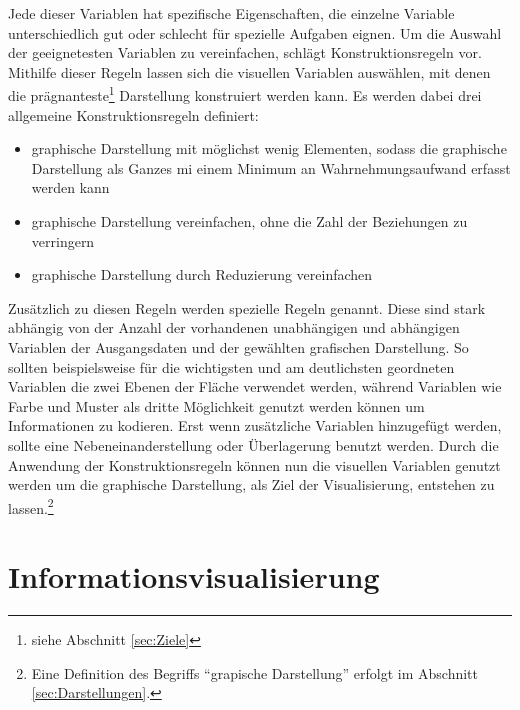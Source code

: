 \documentclass[a4paper, 12pt, DIVcalc, onepage, pdftex, headsepline, footsepline]{scrreprt}
\begin{document}
Jede dieser Variablen hat spezifische Eigenschaften, die einzelne Variable unterschiedlich gut oder schlecht
für spezielle Aufgaben eignen. Um die Auswahl der geeignetesten Variablen zu vereinfachen, schlägt
\citep{Bertin} Konstruktionsregeln vor.
Mithilfe dieser Regeln lassen sich die visuellen Variablen auswählen, mit denen die
prägnanteste\footnote{siehe Abschnitt \ref{sec:Ziele}} Darstellung konstruiert werden kann.
Es werden dabei drei allgemeine Konstruktionsregeln definiert:
\begin{itemize}
\item graphische Darstellung mit möglichst wenig Elementen, sodass die graphische Darstellung
als Ganzes mi einem Minimum an Wahrnehmungsaufwand erfasst werden kann
\item graphische Darstellung vereinfachen, ohne die Zahl der Beziehungen zu verringern
\item graphische Darstellung durch Reduzierung vereinfachen
\end{itemize}
Zusätzlich zu diesen Regeln werden spezielle Regeln genannt. Diese sind stark abhängig von der Anzahl
der vorhandenen unabhängigen und abhängigen Variablen der Ausgangsdaten und der gewählten
grafischen Darstellung. So sollten beispielsweise für die wichtigsten und am deutlichsten
geordneten Variablen die zwei Ebenen der Fläche verwendet werden, während Variablen wie
Farbe und Muster als dritte Möglichkeit genutzt werden können um Informationen zu kodieren.
Erst wenn zusätzliche Variablen hinzugefügt werden, sollte eine Nebeneinanderstellung oder
Überlagerung benutzt werden.
Durch die Anwendung der Konstruktionsregeln können nun die visuellen Variablen genutzt werden um
die graphische Darstellung, als Ziel der Visualisierung, entstehen zu lassen.\footnote{Eine Definition
des Begriffs "`grapische Darstellung"' erfolgt im Abschnitt \ref{sec:Darstellungen}.}

\chapter{Informationsvisualisierung}
\label{cha:Informationsvisualisierung}
\end{document}
